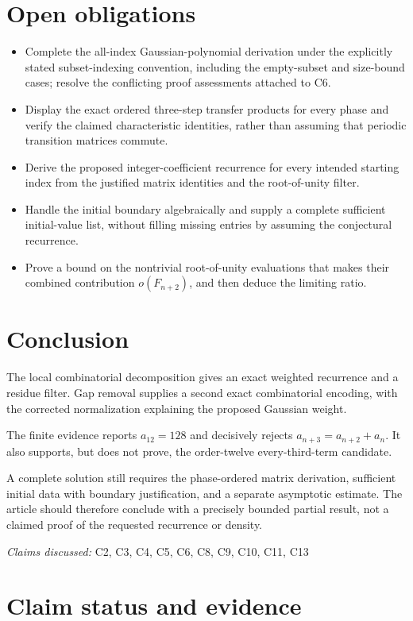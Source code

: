 \documentclass[11pt]{article}
\begin{document}
\section{Open obligations}
\begin{itemize}
\item Complete the all-index Gaussian-polynomial derivation under the explicitly stated subset-indexing convention, including the empty-subset and size-bound cases; resolve the conflicting proof assessments attached to C6.
\item Display the exact ordered three-step transfer products for every phase and verify the claimed characteristic identities, rather than assuming that periodic transition matrices commute.
\item Derive the proposed integer-coefficient recurrence for every intended starting index from the justified matrix identities and the root-of-unity filter.
\item Handle the initial boundary algebraically and supply a complete sufficient initial-value list, without filling missing entries by assuming the conjectural recurrence.
\item Prove a bound on the nontrivial root-of-unity evaluations that makes their combined contribution $o(F_{n+2})$, and then deduce the limiting ratio.
\end{itemize}
\section{Conclusion}
The local combinatorial decomposition gives an exact weighted recurrence and a residue filter. Gap removal supplies a second exact combinatorial encoding, with the corrected normalization explaining the proposed Gaussian weight.

The finite evidence reports $a_{12}=128$ and decisively rejects $a_{n+3}=a_{n+2}+a_n$. It also supports, but does not prove, the order-twelve every-third-term candidate.

A complete solution still requires the phase-ordered matrix derivation, sufficient initial data with boundary justification, and a separate asymptotic estimate. The article should therefore conclude with a precisely bounded partial result, not a claimed proof of the requested recurrence or density.

\textit{Claims discussed: }C2, C3, C4, C5, C6, C8, C9, C10, C11, C13
\section*{Claim status and evidence}
\end{document}
